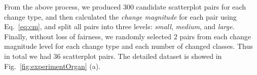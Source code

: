 {From the above process, we produced 300 candidate scatterplot pairs for each change type, and then calculated the \emph{change magnitude} for each pair using Eq.~\ref{eq:cm}, and split all  pairs into three levels: \emph{small}, \emph{medium}, and \emph{large}.
Finally, without loss of fairness, we randomly selected $2$ pairs from each change magnitude level for each change type and each number of changed classes. Thus in total we had $36$ scatterplot pairs. The detailed dataset is showed in Fig.~\ref{fig:experimentOrgan} (a).%
%
%
%

}
